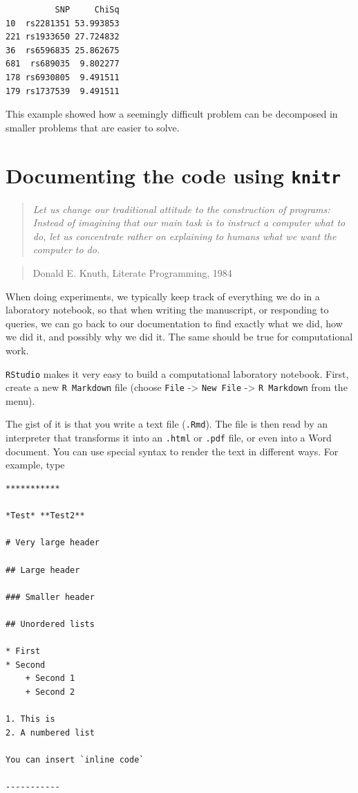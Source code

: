 \documentclass[
  letterpaper,
  DIV=11,
  numbers=noendperiod]{scrreprt}
\begin{document}
\begin{verbatim}
          SNP     ChiSq
10  rs2281351 53.993853
221 rs1933650 27.724832
36  rs6596835 25.862675
681  rs689035  9.802277
178 rs6930805  9.491511
179 rs1737539  9.491511
\end{verbatim}

This example showed how a seemingly difficult problem can be decomposed
in smaller problems that are easier to solve.

\hypertarget{documenting-the-code-using-knitr}{%
\section{\texorpdfstring{Documenting the code using
\texttt{knitr}}{Documenting the code using knitr}}\label{documenting-the-code-using-knitr}}

\begin{quote}
\emph{Let us change our traditional attitude to the construction of
programs: Instead of imagining that our main task is to instruct a
computer what to do, let us concentrate rather on explaining to humans
what we want the computer to do.}
\end{quote}

\begin{quote}
Donald E. Knuth, Literate Programming, 1984
\end{quote}

When doing experiments, we typically keep track of everything we do in a
laboratory notebook, so that when writing the manuscript, or responding
to queries, we can go back to our documentation to find exactly what we
did, how we did it, and possibly why we did it. The same should be true
for computational work.

\texttt{RStudio} makes it very easy to build a computational laboratory
notebook. First, create a new \texttt{R\ Markdown} file (choose
\texttt{File} -\textgreater{} \texttt{New\ File} -\textgreater{}
\texttt{R\ Markdown} from the menu).

The gist of it is that you write a text file (\texttt{.Rmd}). The file
is then read by an interpreter that transforms it into an \texttt{.html}
or \texttt{.pdf} file, or even into a Word document. You can use special
syntax to render the text in different ways. For example, type

\begin{verbatim}
***********

*Test* **Test2**

# Very large header

## Large header

### Smaller header

## Unordered lists

* First
* Second
    + Second 1
    + Second 2

1. This is
2. A numbered list

You can insert `inline code`

-----------
\end{verbatim}
\end{document}
